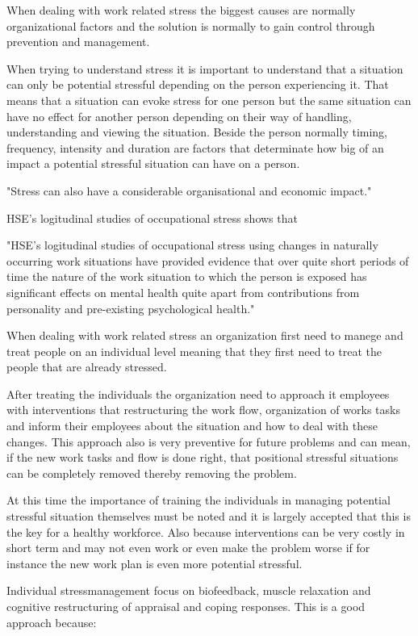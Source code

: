 When dealing with work related stress the biggest causes are normally organizational factors and the solution is normally to gain control through prevention and management.

When trying to understand stress it is important to understand that a situation can only be potential stressful depending on the person experiencing it. That means that a situation can evoke stress for one person but the same situation can have no effect for another person depending on their way of handling, understanding and viewing the situation. Beside the person normally timing, frequency, intensity and duration are factors that determinate how big of an impact a potential stressful situation can have on a person.

"Stress can also have a considerable organisational and economic impact."

HSE's  logitudinal studies of occupational stress shows that 

"HSE's  logitudinal studies of occupational stress using changes in naturally occurring work situations have provided evidence that over quite short periods of time the nature of the work situation to which the person is exposed has significant effects on mental health quite apart from contributions from personality and pre-existing psychological health."

When dealing with work related stress an organization first need to manege and treat people on an individual level meaning that they first need to treat the people that are already stressed.

After treating the individuals the organization need to approach it employees with interventions that restructuring the work flow, organization of works tasks and inform their employees about the situation and how to deal with these changes. This approach also is very preventive for future problems and can mean, if the new work tasks and flow is done right, that positional stressful situations can be completely removed thereby removing the problem.

At this time the importance of training the individuals in managing potential stressful situation themselves must be noted and it is largely accepted that this is the key for a healthy workforce. Also because interventions can be very costly in short term and may not even work or even make the problem worse if for instance the new work plan is even more potential stressful.

Individual stressmanagement focus on biofeedback, muscle relaxation and cognitive restructuring of appraisal and coping responses. This is a good approach because:

